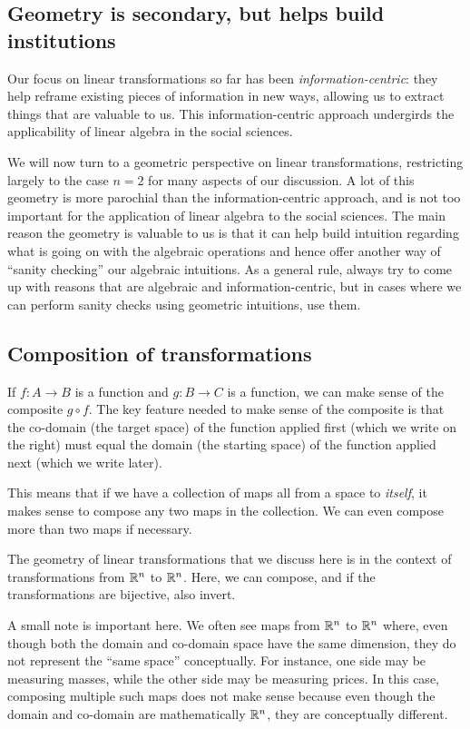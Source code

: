 \documentclass[10pt]{amsart}
\begin{document}
\subsection{Geometry is secondary, but helps build institutions}

Our focus on linear transformations so far has been {\em
  information-centric}: they help reframe existing pieces of
information in new ways, allowing us to extract things that are
valuable to us. This information-centric approach undergirds the
applicability of linear algebra in the social sciences.

We will now turn to a geometric perspective on linear transformations,
restricting largely to the case $n = 2$ for many aspects of our
discussion. A lot of this geometry is more parochial than the
information-centric approach, and is not too important for the
application of linear algebra to the social sciences. The main reason
the geometry is valuable to us is that it can help build intuition
regarding what is going on with the algebraic operations and hence
offer another way of ``sanity checking'' our algebraic intuitions. As
a general rule, always try to come up with reasons that are algebraic
and information-centric, but in cases where we can perform sanity
checks using geometric intuitions, use them.

\subsection{Composition of transformations}

If $f:A \to B$ is a function and $g:B \to C$ is a function, we can
make sense of the composite $g \circ f$. The key feature needed to
make sense of the composite is that the co-domain (the target space)
of the function applied first (which we write on the right) must equal
the domain (the starting space) of the function applied next (which we
write later).

This means that if we have a collection of maps all from a space to
{\em itself}, it makes sense to compose any two maps in the
collection. We can even compose more than two maps if necessary.

The geometry of linear transformations that we discuss here is in the
context of transformations from $\mathbb{R}^n$ to $\mathbb{R}^n$. Here, we can
compose, and if the transformations are bijective, also invert.

A small note is important here. We often see maps from $\mathbb{R}^n$ to
$\mathbb{R}^n$ where, even though both the domain and co-domain space have the
same dimension, they do not represent the ``same space''
conceptually. For instance, one side may be measuring masses, while
the other side may be measuring prices. In this case, composing
multiple such maps does not make sense because even though the domain
and co-domain are mathematically $\mathbb{R}^n$, they are conceptually
different.
\end{document}
